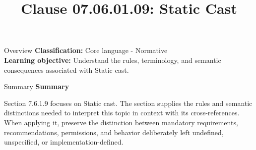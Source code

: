 \documentclass[10pt,letterpaper]{article}
\title{Clause 07.06.01.09: Static Cast}
\author{}
\date{}
\begin{document}
\maketitle
\begin{CornellOverviewBox}{Overview}
\textbf{Classification:} Core language - Normative\\[2pt]
\textbf{Learning objective:} Understand the rules, terminology, and semantic consequences associated with Static cast.
\end{CornellOverviewBox}\begin{CornellSummaryBox}{Summary}
{\sffamily\bfseries\color{Accent} Summary}\par\vspace{3pt}Section 7.6.1.9 focuses on Static cast. The section supplies the rules and semantic distinctions needed to interpret this topic in context with its cross-references. When applying it, preserve the distinction between mandatory requirements, recommendations, permissions, and behavior deliberately left undefined, unspecified, or implementation-defined.
\end{CornellSummaryBox}
\end{document}
